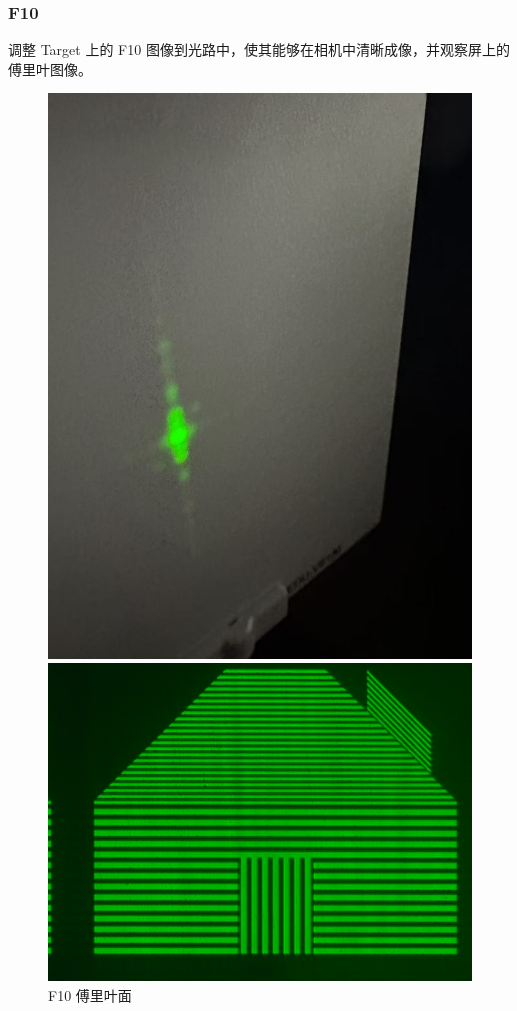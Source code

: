 \documentclass{ctexart}
\begin{document}
\subsubsection{F10}
调整 Target 上的 F10 图像到光路中，使其能够在相机中清晰成像，并观察屏上的傅里叶图像。
\begin{figure}[H]
  \centering
  \begin{minipage}[b]{0.2\textwidth}
    \centering
    \includegraphics[width=\textwidth]{pictures/微信图片_20241017164838.jpg}
    \caption{F10 傅里叶面}
  \end{minipage}
  \hspace{0.1\textwidth} %
  \begin{minipage}[b]{0.3\textwidth}
    \centering
    \includegraphics[width=\textwidth]{pictures/F10-nomask.png}

\end{minipage}
\end{figure}
\end{document}
